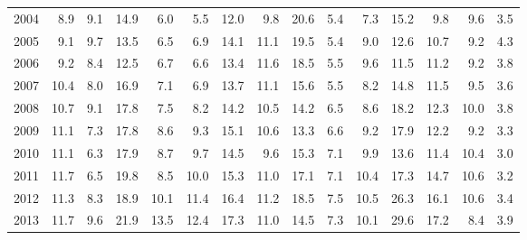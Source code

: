 \begin{tabular}{lrrrrrrrrrrrrrr}
2004           &      8.9 &              9.1 &          14.9 &        6.0 &            5.5 &            12.0 &          9.8 &        20.6 &          5.4 &       7.3 &          15.2 &            9.8 &      9.6 &          3.5 \\
2005           &      9.1 &              9.7 &          13.5 &        6.5 &            6.9 &            14.1 &         11.1 &        19.5 &          5.4 &       9.0 &          12.6 &           10.7 &      9.2 &          4.3 \\
2006           &      9.2 &              8.4 &          12.5 &        6.7 &            6.6 &            13.4 &         11.6 &        18.5 &          5.5 &       9.6 &          11.5 &           11.2 &      9.2 &          3.8 \\
2007           &     10.4 &              8.0 &          16.9 &        7.1 &            6.9 &            13.7 &         11.1 &        15.6 &          5.5 &       8.2 &          14.8 &           11.5 &      9.5 &          3.6 \\
2008           &     10.7 &              9.1 &          17.8 &        7.5 &            8.2 &            14.2 &         10.5 &        14.2 &          6.5 &       8.6 &          18.2 &           12.3 &     10.0 &          3.8 \\
2009           &     11.1 &              7.3 &          17.8 &        8.6 &            9.3 &            15.1 &         10.6 &        13.3 &          6.6 &       9.2 &          17.9 &           12.2 &      9.2 &          3.3 \\
2010           &     11.1 &              6.3 &          17.9 &        8.7 &            9.7 &            14.5 &          9.6 &        15.3 &          7.1 &       9.9 &          13.6 &           11.4 &     10.4 &          3.0 \\
2011           &     11.7 &              6.5 &          19.8 &        8.5 &           10.0 &            15.3 &         11.0 &        17.1 &          7.1 &      10.4 &          17.3 &           14.7 &     10.6 &          3.2 \\
2012           &     11.3 &              8.3 &          18.9 &       10.1 &           11.4 &            16.4 &         11.2 &        18.5 &          7.5 &      10.5 &          26.3 &           16.1 &     10.6 &          3.4 \\
2013           &     11.7 &              9.6 &          21.9 &       13.5 &           12.4 &            17.3 &         11.0 &        14.5 &          7.3 &      10.1 &          29.6 &           17.2 &      8.4 &          3.9 \\

\end{tabular}
